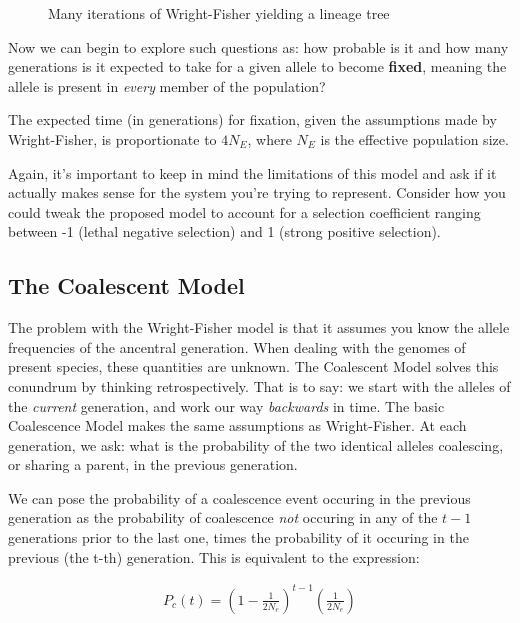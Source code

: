 \begin{figure} [h] 
  \centering 
  \caption{Many iterations of Wright-Fisher yielding a lineage tree}
  \label{Fig14_FisherWrightManyGenerations}
\end{figure}

Now we can begin to explore such questions as: how probable is it and how many generations is it expected to take for a given allele to become \textbf{fixed}, meaning the allele is present in \textit{every} member of the population?

The expected time (in generations) for fixation, given the assumptions made by Wright-Fisher, is proportionate to $4N_{E}$, where $N_{E}$ is the effective population size.

Again, it's important to keep in mind the limitations of this model and ask if it actually makes sense for the system you're trying to represent. Consider how you could tweak the proposed model to account for a selection coefficient ranging between -1 (lethal negative selection) and 1 (strong positive selection).

\pagebreak
\subsection{The Coalescent Model}

The problem with the Wright-Fisher model is that it assumes you know the allele frequencies of the ancentral generation. When dealing with the genomes of present species, these quantities are unknown. The Coalescent Model solves this conundrum by thinking retrospectively. That is to say: we start with the alleles of the \textit{current} generation, and work our way \textit{backwards} in time. The basic Coalescence Model makes the same assumptions as Wright-Fisher. At each generation, we ask: what is the probability of the two identical alleles coalescing, or sharing a parent, in the previous generation.

We can pose the probability of a coalescence event occuring in the previous generation as the probability of coalescence \textit{not} occuring in any of the $t-1$ generations prior to the last one, times the probability of it occuring in the previous (the t-th) generation. This is equivalent to the expression:

\begin{align}
P_c(t) = \left(1-\frac{1}{2N_e}\right)^{t-1} \left(\frac{1}{2N_e}\right)
\end{align}


